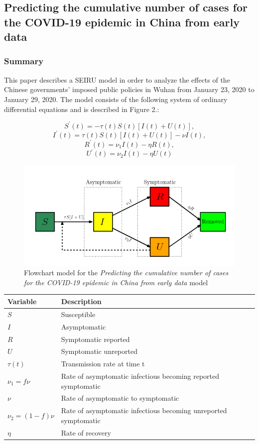 \documentclass{article}
\begin{document}
\subsection{Predicting the cumulative number of cases for the COVID-19 epidemic in China from early data}
\subsubsection{Summary}
This paper describes a SEIRU model in order to analyze the effects of the Chinese governments' imposed public policies in Wuhan from January 23, 2020 to January 29, 2020. The model consists of the following system of ordinary differential equations and is described in Figure 2.:

\[S^{'} (t) = - \tau (t)S(t)[I(t) + U(t)],\]
\[I^{'} (t) = \tau (t)S(t)[I(t) + U(t)] - \nu I(t), \]
\[R^{'} (t) = \nu _1 I(t) - \eta R(t), \]
\[U^{'} (t) = \nu _2 I(t) - \eta U(t) \]

\begin{figure}
\includegraphics[scale=0.5]{cumulative.png}
\caption{Flowchart model for the \textit{Predicting the cumulative number of cases for the COVID-19 epidemic in China from early data} model}
\end{figure}

\begin{tabular}{|l | l |} 
  \hline
  Variable & Description \\ [0.5ex] 
  \hline\hline
  $S$ & Susceptible \\
  \hline
  $I$ & Asymptomatic \\
  \hline
  $R$ & Symptomatic reported \\
  \hline
  $U$ & Symptomatic unreported \\
  \hline
  $\tau (t)$ & Transmission rate at time t \\
  \hline
  $\nu _1 = f \nu$ & Rate of asymptomatic infectious becoming reported symptomatic \\
  \hline
  $\nu $ & Rate of asymptomatic to symptomatic \\
  \hline
  $\nu _2 = (1 - f) \nu$ & Rate of asymptomatic infectious becoming unreported symptomatic \\
  \hline
  $\eta $ & Rate of recovery \\
  \hline
\end{tabular}
\cite{cumulative}
\end{document}
